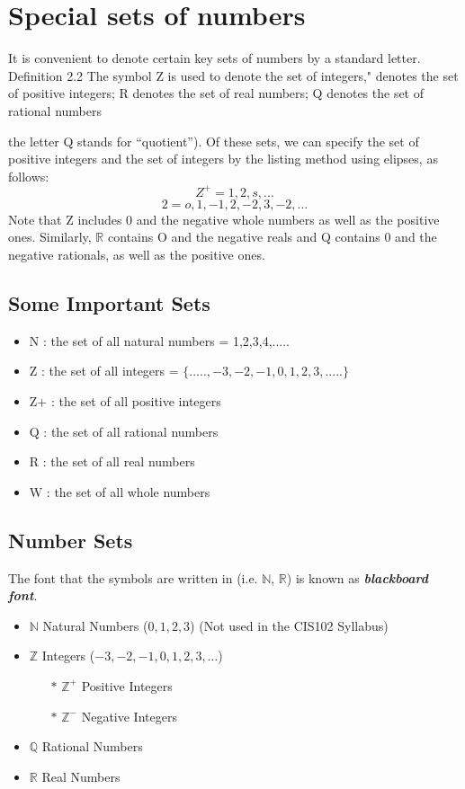 \documentclass[11pt,a4paper,titlepage,oneside,openany]{article}
\numberwithin{equation}{section}
\numberwithin{algorithm}{section}
\numberwithin{figure}{section}
\numberwithin{table}{section}
\begin{document}
\section{Special sets of numbers}
\smallskip 
It is convenient to denote certain key sets of numbers by a standard letter.
Definition 2.2 
The symbol Z is used to denote the set of integers," 
 denotes the set of positive integers; 
 R denotes the set of real numbers;
Q denotes the set of rational numbers {the letter Q stands for “quotient”).
\smallskip 
\smallskip 
Of these sets, we can specify the set of positive integers and the set of integers by the listing method
using elipses, as follows:
\[Z^{+} = {1,2,s,...}\]
\[2 = {o,1,-1,2,-2,3,-2,...}\]
Note that Z includes 0 and the negative whole numbers as well as the positive ones. Similarly,
$\mathbb{R}$ contains O and the negative reals and Q contains 0 and the negative rationals, as well as the
positive ones.


\subsection{Some Important Sets}
\begin{itemize}
\item N : the set of all natural numbers = {1,2,3,4,.....}
\item Z : the set of all integers = $\{.....,-3,-2,-1,0,1,2,3,.....\}$
\item Z+ : the set of all positive integers
\item Q : the set of all rational numbers
\item R : the set of all real numbers
\item W : the set of all whole numbers
\end{itemize}


\subsection{Number Sets}
The font that the symbols are written in (i.e. $\mathbb{N}$, $\mathbb{R}$) is known as \textit{\textbf{blackboard font}}.
\begin{itemize}
\item $\mathbb{N}$ Natural Numbers ($0,1,2,3$) 
(Not used in the CIS102 Syllabus)
\item $\mathbb{Z}$ Integers ($-3,-2,-1,0,1,2,3, \ldots$)
\begin{itemize}
\item[$\ast$] $\mathbb{Z}^{+}$ Positive Integers
\item[$\ast$] $\mathbb{Z}^{-}$ Negative Integers
\end{itemize}
\item $\mathbb{Q}$ Rational Numbers
\item $\mathbb{R}$ Real Numbers
\end{itemize}

}
\end{document}
